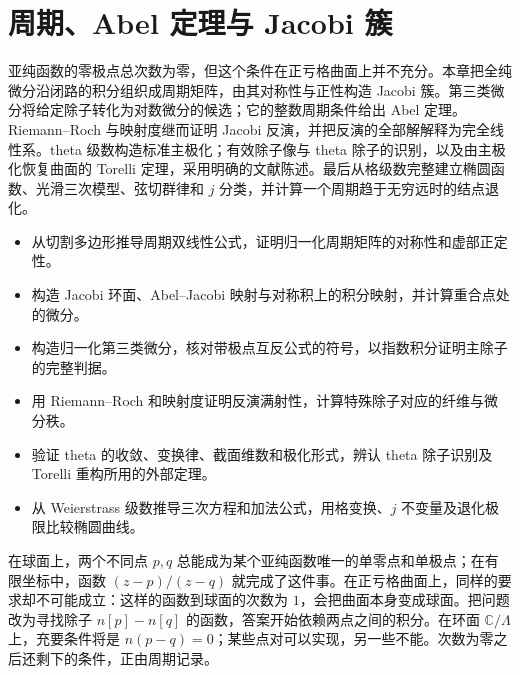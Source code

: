 
% 
% 

\chapter{周期、Abel 定理与 Jacobi 簇}
\label{g4:ch:04}

\begin{chapterabstract}
	亚纯函数的零极点总次数为零，但这个条件在正亏格曲面上并不充分。本章把全纯微分沿闭路的积分组织成周期矩阵，由其对称性与正性构造 Jacobi 簇。第三类微分将给定除子转化为对数微分的候选；它的整数周期条件给出 Abel 定理。Riemann--Roch 与映射度继而证明 Jacobi 反演，并把反演的全部解解释为完全线性系。theta 级数构造标准主极化；有效除子像与 theta 除子的识别，以及由主极化恢复曲面的 Torelli 定理，采用明确的文献陈述。最后从格级数完整建立椭圆函数、光滑三次模型、弦切群律和 \(j\) 分类，并计算一个周期趋于无穷远时的结点退化。
\end{chapterabstract}

\begin{learninggoals}
	\begin{itemize}
		\item 从切割多边形推导周期双线性公式，证明归一化周期矩阵的对称性和虚部正定性。
		\item 构造 Jacobi 环面、Abel--Jacobi 映射与对称积上的积分映射，并计算重合点处的微分。
		\item 构造归一化第三类微分，核对带极点互反公式的符号，以指数积分证明主除子的完整判据。
		\item 用 Riemann--Roch 和映射度证明反演满射性，计算特殊除子对应的纤维与微分秩。
		\item 验证 theta 的收敛、变换律、截面维数和极化形式，辨认 theta 除子识别及 Torelli 重构所用的外部定理。
		\item 从 Weierstrass 级数推导三次方程和加法公式，用格变换、\(j\) 不变量及退化极限比较椭圆曲线。
	\end{itemize}
\end{learninggoals}

在球面上，两个不同点 \(p,q\) 总能成为某个亚纯函数唯一的单零点和单极点；在有限坐标中，函数 \((z-p)/(z-q)\) 就完成了这件事。在正亏格曲面上，同样的要求却不可能成立：这样的函数到球面的次数为 \(1\)，会把曲面本身变成球面。把问题改为寻找除子 \(n[p]-n[q]\) 的函数，答案开始依赖两点之间的积分。在环面 \(\mathbb C/\Lambda\) 上，充要条件将是 \(n(p-q)=0\)；某些点对可以实现，另一些不能。次数为零之后还剩下的条件，正由周期记录。

